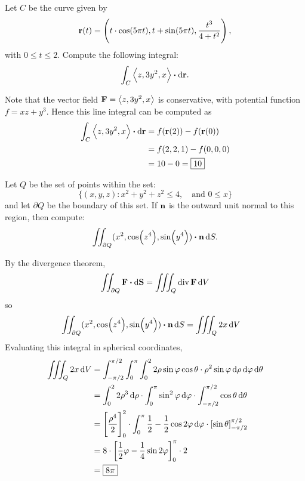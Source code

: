 \documentclass[12pt,answers]{exam}
\newcommand{\vect}[1]{\left\langle #1 \right\rangle}
\newcommand{\tdiv}{\operatorname{div}}
\begin{document}
\begin{questions}
	\newpage
	\question
	Let $C$ be the curve given by 
	\[
		\vb{r}(t) = \left(t \cdot \cos(5\pi t), t + \sin(5\pi t), \frac{t^3}{4+t^2}\right), 
	\]
	with $0 \le t \le 2$. Compute the following integral: 
	\[
		\int_C \vect{z, 3y^2, x} \vdot \dif \vb{r}.
	\]
	\begin{solution}
		Note that the vector field $\vb{F} = \vect{z, 3y^2, x}$ is conservative, with potential function $f = xz + y^3$.
		Hence this line integral can be computed as
		\begin{align*}
			\int_C \vect{z, 3y^2, x} \vdot \dif \vb{r}
			&= f(\vb{r}(2)) - f(\vb{r}(0)) \\ 
			&= f(2,2,1) - f(0,0,0) \\ 
			&= 10 - 0 = \boxed{10}
		\end{align*}
	\end{solution}

	\newpage
	\question
	Let $Q$ be the set of points within the set:
	\[
		\{ (x,y,z) : x^2+y^2+z^2 \le 4, \quad \text{and } 0 \le x \}
	\]
	and let $\partial Q$ be the boundary of this set. If $\vb{n}$ is the outward unit normal to this region, then compute:
	\[
		\iint_{\partial Q} (x^2, \cos(z^4), \sin(y^4)) \vdot \vb{n} \dif S.
	\]
	\begin{solution}
		By the divergence theorem, 
		\[
			\iint_{\partial Q} \vb{F} \vdot \dif \vb{S} = \iiint_{Q} \tdiv \vb F \dif V
		\]
		so 
		\begin{align*}
			\iint_{\partial Q} (x^2, \cos(z^4), \sin(y^4)) \vdot \vb{n} \dif S
			&= \iiint_Q 2x \dif V
		\end{align*}
		Evaluating this integral in spherical coordinates,
		\begin{align*}
			\iiint_{Q} 2x \dif V 
			&= \int_{-\pi/2}^{\pi/2} \int_0^\pi \int_0^2 2 \rho \sin\varphi \cos\theta \cdot \rho^2 \sin\varphi \dif \rho \dif \varphi \dif \theta\\
			&= \int_0^2 2\rho^3 \dif \rho \cdot \int_0^\pi \sin^2\varphi \dif \varphi \cdot \int_{-\pi/2}^{\pi/2} \cos\theta \dif \theta\\
			&= \left[ \frac{\rho^4}{2} \right]_0^2 \cdot \int_0^\pi \frac12 - \frac12 \cos 2\varphi \dif \varphi \cdot \left[\sin\theta\right]_{-\pi/2}^{\pi/2} \\ 
			&= 8 \cdot \left[ \frac12 \varphi - \frac14 \sin 2\varphi\right]_0^\pi \cdot 2 \\ 
			&= \boxed{8\pi}
		\end{align*}
	\end{solution}


\end{questions}
\end{document}
